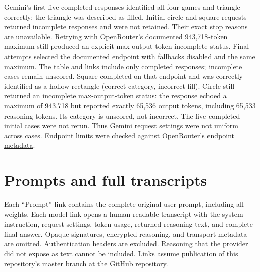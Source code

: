 \documentclass[11pt]{article}
\begin{document}
Gemini's first five completed responses identified all four games and triangle
correctly; the triangle was described as filled. Initial circle and square
requests returned incomplete responses and were not retained. Their exact stop
reasons are unavailable. Retrying with OpenRouter's documented 943,718-token
maximum still produced an explicit max-output-token incomplete status. Final
attempts selected the documented  endpoint with
fallbacks disabled and the same maximum. The table and links include only
completed responses; incomplete cases remain unscored. Square completed on
that endpoint and was correctly identified as a hollow rectangle (correct category,
incorrect fill). Circle still returned an incomplete max-output-token status:
the response echoed a maximum of 943,718 but reported exactly 65,536 output
tokens, including 65,533 reasoning tokens. Its category is unscored, not incorrect.
The five completed initial cases were not rerun. Thus Gemini request settings were not uniform
across cases. Endpoint limits were checked against
\href{https://openrouter.ai/api/v1/models/google/gemini-4-argon/endpoints}{OpenRouter's endpoint metadata}.

\section*{Prompts and full transcripts}
Each ``Prompt'' link contains the complete original user prompt, including all
weights. Each model link opens a human-readable transcript with the system
instruction, request settings, token usage, returned reasoning text, and complete
final answer. Opaque signatures, encrypted reasoning, and transport metadata are
omitted. Authentication headers are excluded. Reasoning that the provider did
not expose as text cannot be included. Links assume publication of this repository's master branch
at \href{https://github.com/yikerman/llm-rw-weight-extended-test}{the GitHub repository}.
\end{document}

